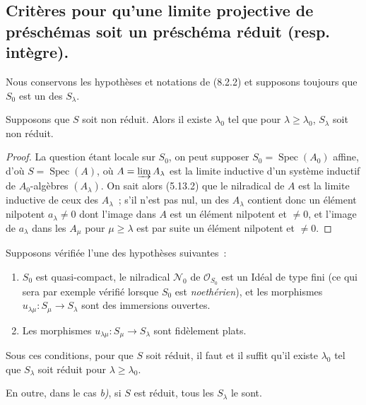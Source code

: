 \subsection{Critères pour qu'une limite projective de préschémas soit un préschéma réduit \textmd{(resp.} intègre\textmd{).}}
\label{subsection:IV.8.7-fr}

Nous conservons les hypothèses et notations de (8.2.2) et supposons toujours
que $S_0$ est un des $S_\lambda$.

\begin{proposition}[8.7.1]
\label{IV.8.7.1-fr}
Supposons que $S$ soit non réduit. Alors il existe $\lambda_0$ tel que pour
$\lambda\geq\lambda_0$, $S_\lambda$ soit non réduit.
\end{proposition}

\begin{proof}
La question étant locale sur $S_0$, on peut supposer
$S_0=\operatorname{Spec}(A_0)$ affine, d'où $S=\operatorname{Spec}(A)$, où
$A=\varinjlim A_\lambda$ est la limite inductive d'un système inductif de
$A_0$-algèbres $(A_\lambda)$. On sait alors (5.13.2) que le nilradical de $A$
est la limite inductive de ceux des $A_\lambda$~; s'il n'est pas nul, un des
$A_\lambda$ contient donc un élément nilpotent $a_\lambda\neq0$ dont l'image
dans $A$ est un élément nilpotent et $\neq0$, et l'image de $a_\lambda$ dans
les $A_\mu$ pour $\mu\geq\lambda$ est par suite un élément nilpotent et
$\neq0$.
\end{proof}

\begin{proposition}[8.7.2]
\label{IV.8.7.2-fr}
Supposons vérifiée \textup{l'une} des hypothèses suivantes~:
\begin{enumerate}
\item[\emph{a)}] $S_0$ est quasi-compact, le nilradical $\mathcal N_0$ de
$\mathcal O_{S_0}$ est un Idéal de type fini \textup{(ce qui sera par exemple vérifié
lorsque $S_0$ est \emph{noethérien})}, et les morphismes
$u_{\lambda\mu}:S_\mu\to S_\lambda$ sont des immersions ouvertes.
\item[\emph{b)}] Les morphismes $u_{\lambda\mu}:S_\mu\to S_\lambda$ sont
fidèlement plats.
\end{enumerate}

Sous ces conditions, pour que $S$ soit réduit, il faut et il suffit qu'il
existe $\lambda_0$ tel que $S_\lambda$ soit réduit pour
$\lambda\geq\lambda_0$.

En outre, dans le cas \emph{b)}, si $S$ est réduit, tous les $S_\lambda$ le
sont.
\end{proposition}

